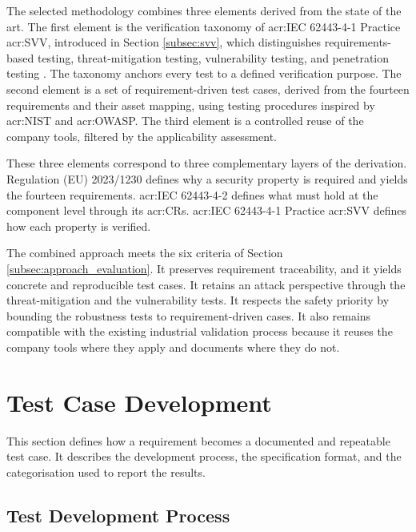 The selected methodology combines three elements derived from the state of the art. The first element is the verification taxonomy of \gls{acr:IEC} 62443-4-1 Practice \gls{acr:SVV}, introduced in Section \ref{subsec:svv}, which distinguishes requirements-based testing, threat-mitigation testing, vulnerability testing, and penetration testing \cite[pp. 37]{DIN_EN_IEC_62443_4_1_2018}. The taxonomy anchors every test to a defined verification purpose. The second element is a set of requirement-driven test cases, derived from the fourteen requirements and their asset mapping, using testing procedures inspired by \gls{acr:NIST} and \gls{acr:OWASP}. The third element is a controlled reuse of the company tools, filtered by the applicability assessment. 

These three elements correspond to three complementary layers of the derivation. Regulation (EU) 2023/1230 defines why a security property is required and yields the fourteen requirements. \gls{acr:IEC} 62443-4-2 defines what must hold at the component level through its \glspl{acr:CR}. \gls{acr:IEC} 62443-4-1 Practice \gls{acr:SVV} defines how each property is verified. 

The combined approach meets the six criteria of Section \ref{subsec:approach_evaluation}. It preserves requirement traceability, and it yields concrete and reproducible test cases. It retains an attack perspective through the threat-mitigation and the vulnerability tests. It respects the safety priority by bounding the robustness tests to requirement-driven cases. It also remains compatible with the existing industrial validation process because it reuses the company tools where they apply and documents where they do not.




\section{Test Case Development}
\label{sec:test_derivation} 
This section defines how a requirement becomes a documented and repeatable test case. It describes the development process, the specification format, and the categorisation used to report the results. 

\subsection{Test Development Process} 
\label{subsec:test_development} 

